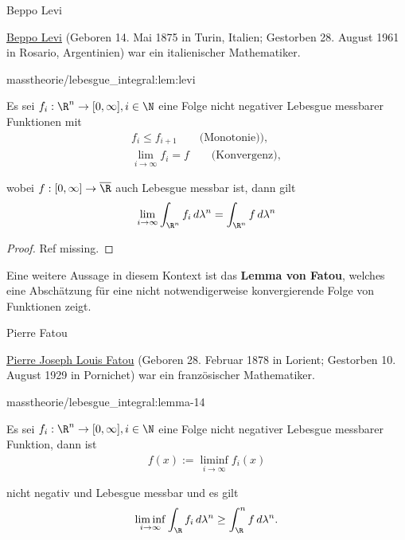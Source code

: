 \documentclass[letterpaper,10pt,german]{jupyterBook}
\begin{document}
\begin{emphBox}{Beppo Levi}{}

\par
\href{https://de.wikipedia.org/wiki/Beppo\_Levi}{Beppo Levi} (Geboren 14. Mai 1875 in Turin, Italien; Gestorben 28. August 1961 in Rosario, Argentinien) war ein italienischer Mathematiker.
\end{emphBox}
\begin{lemma}{}{masstheorie/lebesgue_integral:lem:levi}



\par
Es sei \(f_i:\R^n\to[0,\infty],i\in\N\) eine Folge nicht negativer Lebesgue messbarer Funktionen mit
\begin{align*}
f_i\leq f_{i+1}\qquad\text{(Monotonie))},\\
\lim_{i\to\infty} f_i = f\qquad\text{(Konvergenz)},
\end{align*}
\par
wobei \(f:[0,\infty]\to\overline{\R}\) auch Lebesgue messbar ist, dann gilt
\begin{align*}
\lim_{i\to\infty} \int_{\R^n} f_i \,d\lambda^n = \int_{\R^n} f \,d\lambda^n
\end{align*}\end{lemma}

\begin{proof}
 Ref missing.
\end{proof}

\par
Eine weitere Aussage in diesem Kontext ist das \textbf{Lemma von Fatou}, welches eine Abschätzung für eine nicht notwendigerweise konvergierende Folge von Funktionen zeigt.

\begin{emphBox}{Pierre Fatou}{}

\par
\href{https://de.wikipedia.org/wiki/Pierre\_Fatou}{Pierre Joseph Louis Fatou} (Geboren 28. Februar 1878 in Lorient; Gestorben 10. August 1929 in Pornichet) war ein französischer Mathematiker.
\end{emphBox}
\begin{lemma}{}{masstheorie/lebesgue_integral:lemma-14}



\par
Es sei \(f_i:\R^n\to[0,\infty],i\in\N\) eine Folge nicht negativer Lebesgue messbarer Funktion, dann ist
\begin{align*}
f(x) := \liminf_{i\to\infty} f_i(x)
\end{align*}
\par
nicht negativ und Lebesgue messbar und es gilt
\begin{align*}
\liminf_{i\to\infty} \int_{\R} f_i\, d\lambda^n \geq \int_\R^n f\, d\lambda^n.
\end{align*}\end{lemma}
\end{document}
